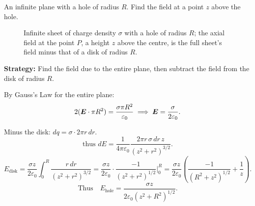 \begin{example}
An infinite plane with a hole of radius $R$. Find the field at a point $z$ above the hole.

\begin{figure}[H]
\begin{center}
\end{center}
\caption{Infinite sheet of charge density $\sigma$ with a hole of radius $R$; the axial field at the point $P$, a height $z$ above the centre, is the full sheet's field minus that of a disk of radius $R$.}
\end{figure}

\textbf{Strategy:} Find the field due to the entire plane, then subtract the field from the disk of radius $R$.

By Gauss's Law for the entire plane:
\[
    2(\vect{E}\cdot\pi R^2) = \frac{\sigma\pi R^2}{\varepsilon_0}
    \implies \vect{E} = \frac{\sigma}{2\varepsilon_0}.
\]

Minus the disk: $dq = \sigma\cdot 2\pi r\,dr$.
\[
    \text{thus } dE = \frac{1}{4\pi\varepsilon_0}\frac{2\pi r\,\sigma\,dr\,z}{(z^2+r^2)^{3/2}}.
\]
\[
    E_\text{disk} = \frac{\sigma z}{2\varepsilon_0}\int_0^R\frac{r\,dr}{(z^2+r^2)^{3/2}}
                  = \frac{\sigma z}{2\varepsilon_0}\cdot\frac{-1}{(z^2+r^2)^{1/2}}\Bigg|_0^R
                  = \frac{\sigma z}{2\varepsilon_0}\left(\frac{-1}{(R^2+z^2)^{1/2}} + \frac{1}{z}\right).
\]
\[
    \text{Thus} \quad \boxed{E_\text{hole} = \frac{\sigma z}{2\varepsilon_0(z^2+R^2)^{1/2}}}.
\]
\end{example}


